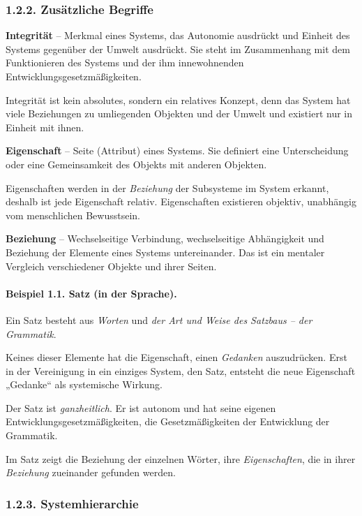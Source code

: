 \documentclass[11pt,a4paper]{article}
\begin{document}
\subsubsection*{1.2.2. Zusätzliche Begriffe}

\textbf{Integrität} -- Merkmal eines Systems, das Autonomie ausdrückt und
Einheit des Systems gegenüber der Umwelt ausdrückt. Sie steht im Zusammenhang
mit dem Funktionieren des Systems und der ihm innewohnenden
Entwicklungsgesetzmäßigkeiten.

Integrität ist kein absolutes, sondern ein relatives Konzept, denn das System
hat viele Beziehungen zu umliegenden Objekten und der Umwelt und existiert nur
in Einheit mit ihnen.

\textbf{Eigenschaft} -- Seite (Attribut) eines Systems. Sie definiert 
eine Unterscheidung oder eine Gemeinsamkeit des Objekts mit anderen Objekten.

Eigenschaften werden in der \emph{Beziehung} der Subsysteme im System erkannt,
deshalb ist jede Eigenschaft relativ. Eigenschaften existieren objektiv,
unabhängig vom menschlichen Bewusstsein.

\textbf{Beziehung} -- Wechselseitige Verbindung, wechselseitige Abhängigkeit
und Beziehung der Elemente eines Systems untereinander. Das ist ein mentaler
Vergleich verschiedener Objekte und ihrer Seiten.

\paragraph{Beispiel 1.1. Satz (in der Sprache).}
Ein Satz besteht aus \emph{Worten} und \emph{der Art und Weise des Satzbaus --
  der Grammatik}.

Keines dieser Elemente hat die Eigenschaft, einen \emph{Gedanken}
auszudrücken.  Erst in der Vereinigung in ein einziges System, den Satz,
entsteht die neue Eigenschaft „Gedanke“ als systemische Wirkung.

Der Satz ist \emph{ganzheitlich}. Er ist autonom und hat seine eigenen
Entwicklungsgesetzmäßig\-keiten, die Gesetzmäßigkeiten der Entwicklung der
Grammatik.

Im Satz zeigt die Beziehung der einzelnen Wörter, ihre \emph{Eigenschaften},
die in ihrer \emph{Beziehung} zueinander gefunden werden.

\subsubsection*{1.2.3. Systemhierarchie}
\end{document}
